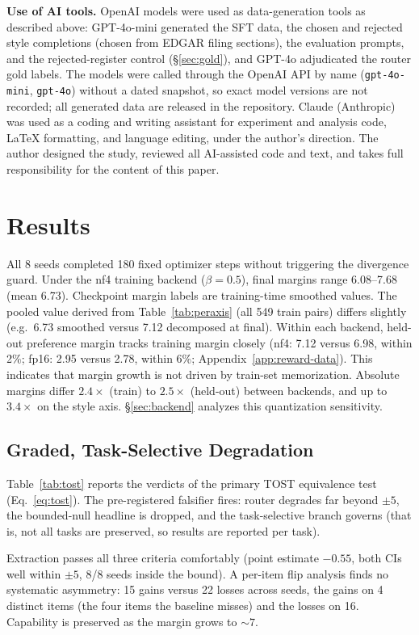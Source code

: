 \documentclass{article}
\begin{document}
\textbf{Use of AI tools.} OpenAI models were used as data-generation tools as described above: GPT-4o-mini generated the SFT data, the chosen and rejected style completions (chosen from EDGAR filing sections), the evaluation prompts, and the rejected-register control (\S\ref{sec:gold}), and GPT-4o adjudicated the router gold labels. The models were called through the OpenAI API by name (\texttt{gpt-4o-mini}, \texttt{gpt-4o}) without a dated snapshot, so exact model versions are not recorded; all generated data are released in the repository. Claude (Anthropic) was used as a coding and writing assistant for experiment and analysis code, LaTeX formatting, and language editing, under the author's direction. The author designed the study, reviewed all AI-assisted code and text, and takes full responsibility for the content of this paper.

\section{Results}

All 8 seeds completed 180 fixed optimizer steps without triggering the divergence guard. Under the nf4 training backend ($\beta = 0.5$), final margins range 6.08--7.68 (mean 6.73). Checkpoint margin labels are training-time smoothed values. The pooled value derived from Table~\ref{tab:peraxis} (all 549 train pairs) differs slightly (e.g.\ 6.73 smoothed versus 7.12 decomposed at final). Within each backend, held-out preference margin tracks training margin closely (nf4: 7.12 versus 6.98, within 2\%; fp16: 2.95 versus 2.78, within 6\%; Appendix~\ref{app:reward-data}). This indicates that margin growth is not driven by train-set memorization. Absolute margins differ $2.4\times$ (train) to $2.5\times$ (held-out) between backends, and up to $3.4\times$ on the style axis. \S\ref{sec:backend} analyzes this quantization sensitivity.

\subsection{Graded, Task-Selective Degradation}
\label{sec:graded}
Table~\ref{tab:tost} reports the verdicts of the primary TOST equivalence test (Eq.~\eqref{eq:tost}). The pre-registered falsifier fires: router degrades far beyond $\pm5$, the bounded-null headline is dropped, and the task-selective branch governs (that is, not all tasks are preserved, so results are reported per task).

Extraction passes all three criteria comfortably (point estimate $-0.55$, both CIs well within $\pm5$, 8/8 seeds inside the bound). A per-item flip analysis finds no systematic asymmetry: 15 gains versus 22 losses across seeds, the gains on 4 distinct items (the four items the baseline misses) and the losses on 16. Capability is preserved as the margin grows to ${\sim}7$.
\end{document}
